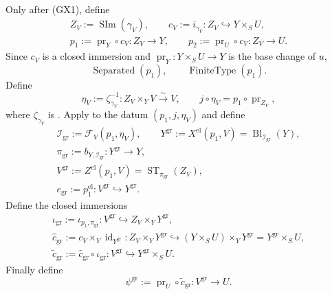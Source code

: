 \begin{definition}
\[\begin{gathered}
  \end{gathered}                                                   \tag{GX1}
  \]
  Only after (GX1), define
  \[
  \begin{gathered}
    Z_V:=\operatorname{SIm}(\gamma_V),\qquad
    c_V:=i_{\gamma_V}\colon Z_V\hookrightarrow Y\times_SU,\\
    p_1:=\operatorname{pr}_Y\circ c_V\colon Z_V\to Y,\qquad
    p_2:=\operatorname{pr}_U\circ c_V\colon Z_V\to U.
  \end{gathered}
  \]
  Since $c_V$ is a closed immersion and
  $\operatorname{pr}_Y\colon Y\times_SU\to Y$ is the base change of $u$,
  \[
    \operatorname{Separated}(p_1),\qquad
    \operatorname{FiniteType}(p_1).
  \]
  Define
  \[
    \eta_V:=\zeta_{\gamma_V}^{-1}
      \colon Z_V\times_YV\xrightarrow{\sim}V,
    \qquad
    j\circ\eta_V=p_1\circ\operatorname{pr}_{Z_V},
  \]
  where $\zeta_{\gamma_V}$ is
  .  Apply
   to the datum
  $(p_1,j,\eta_V)$ and define
  \[
  \begin{gathered}
    \mathcal I_{\mathrm{gr}}:=\mathcal F_V(p_1,\eta_V),\qquad
    Y^{\mathrm{gr}}:=X^{\mathrm{el}}(p_1,V)
      =\operatorname{Bl}_{\mathcal I_{\mathrm{gr}}}(Y),\\
    \pi_{\mathrm{gr}}:=b_{Y,\mathcal I_{\mathrm{gr}}}
      \colon Y^{\mathrm{gr}}\to Y,\\
    V^{\mathrm{gr}}:=Z^{\mathrm{el}}(p_1,V)
      =\operatorname{ST}_{\pi_{\mathrm{gr}}}(Z_V),\\
    e_{\mathrm{gr}}:=p_1^{\mathrm{el}}\colon
      V^{\mathrm{gr}}\hookrightarrow Y^{\mathrm{gr}}.
  \end{gathered}
  \]
  Define the closed immersions
  \[
  \begin{gathered}
    \iota_{\mathrm{gr}}:=\iota_{p_1,\pi_{\mathrm{gr}}}
      \colon V^{\mathrm{gr}}\hookrightarrow Z_V\times_YY^{\mathrm{gr}},\\
    \widehat c_{\mathrm{gr}}:=
      c_V\times_Y\operatorname{id}_{Y^{\mathrm{gr}}}
      \colon Z_V\times_YY^{\mathrm{gr}}\hookrightarrow
        (Y\times_SU)\times_YY^{\mathrm{gr}}
        =Y^{\mathrm{gr}}\times_SU,\\
    \widetilde c_{\mathrm{gr}}:=
      \widehat c_{\mathrm{gr}}\circ\iota_{\mathrm{gr}}
      \colon V^{\mathrm{gr}}\hookrightarrow Y^{\mathrm{gr}}\times_SU.
  \end{gathered}
  \]
  Finally define
  \[
    \psi^{\mathrm{gr}}
      :=\operatorname{pr}_U\circ\widetilde c_{\mathrm{gr}}
      \colon V^{\mathrm{gr}}\to U.
  \]
\end{definition}

